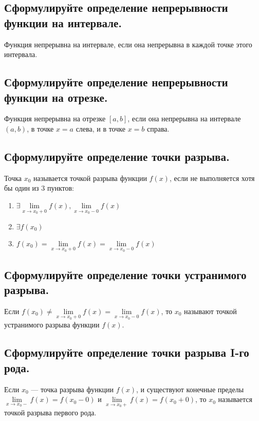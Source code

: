     \subsection{Сформулируйте определение непрерывности функции на интервале.}

    Функция непрерывна на интервале, если она непрерывна в каждой точке этого интервала.

    \subsection{Сформулируйте определение непрерывности функции на отрезке.}

    Функция непрерывна на отрезке $[a,b]$, если она непрерывна на интервале $(a, b)$,
    в точке $x = a$ слева, и в точке $x = b$ справа.

    \subsection{Сформулируйте определение точки разрыва.}

    Точка $x_0$ называется точкой разрыва функции $f(x)$, если не выполняется хотя бы один из 3 пунктов:
    \begin{enumerate}
        \item $\exists\lim\limits_{x \to x_0 + 0}f(x),\lim\limits_{x \to x_0 - 0}f(x)$
        \item $\exists f(x_0)$
        \item $f(x_0) = \lim\limits_{x \to x_0 + 0}f(x) = \lim\limits_{x \to x_0 - 0}f(x)$
    \end{enumerate} 

    \subsection{Сформулируйте определение точки устранимого разрыва.}

    Если $f(x_0) \ne \lim\limits_{x \to x_0 + 0}f(x) = \lim\limits_{x \to x_0 - 0}f(x)$, то 
    $x_0$ называют точкой устранимого разрыва функции $f(x)$.

    \subsection{Сформулируйте определение точки разрыва I-го рода.}
    
    Если $x_0$ — точка разрыва функции $f(x)$, и существуют конечные пределы
    $\lim\limits_{x \to x_0-} f(x) = f(x_0 - 0)$ и $\lim\limits_{x \to x_0+} f(x) = f(x_0 + 0)$,
    то $x_0$ называется точкой разрыва первого рода.

